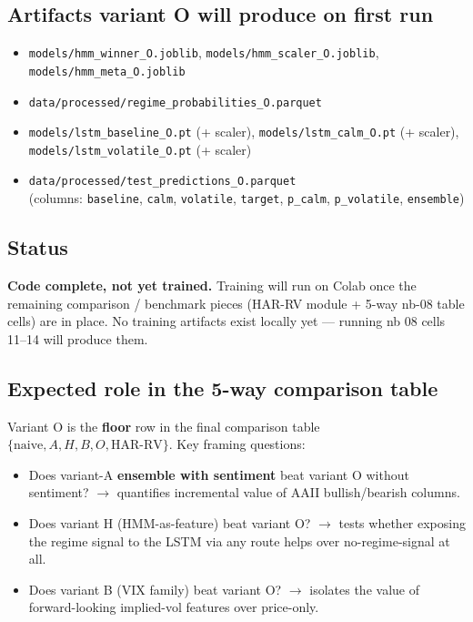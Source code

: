 \documentclass[11pt]{article}
\begin{document}
\subsection*{Artifacts variant O will produce on first run}

\begin{itemize}[leftmargin=*]
  \item \texttt{models/hmm\_winner\_O.joblib}, \allowbreak \texttt{models/hmm\_scaler\_O.joblib}, \allowbreak \texttt{models/hmm\_meta\_O.joblib}
  \item \texttt{data/processed/regime\_probabilities\_O.parquet}
  \item \texttt{models/lstm\_baseline\_O.pt} (+ scaler), \allowbreak \texttt{models/lstm\_calm\_O.pt} (+ scaler), \allowbreak \texttt{models/lstm\_volatile\_O.pt} (+ scaler)
  \item \texttt{data/processed/test\_predictions\_O.parquet} \\ (columns: \texttt{baseline}, \texttt{calm}, \texttt{volatile}, \texttt{target}, \texttt{p\_calm}, \texttt{p\_volatile}, \texttt{ensemble})
\end{itemize}

\subsection*{Status}

\textbf{Code complete, not yet trained.} Training will run on Colab once the remaining comparison / benchmark pieces (HAR-RV module + 5-way nb-08 table cells) are in place. No training artifacts exist locally yet --- running nb 08 cells 11--14 will produce them.

\subsection*{Expected role in the 5-way comparison table}

Variant O is the \textbf{floor} row in the final comparison table $\{\text{naive}, A, H, B, O, \text{HAR-RV}\}$. Key framing questions:

\begin{itemize}[leftmargin=*]
  \item Does variant-A \textbf{ensemble with sentiment} beat variant O without sentiment? $\to$ quantifies incremental value of AAII bullish/bearish columns.
  \item Does variant H (HMM-as-feature) beat variant O? $\to$ tests whether exposing the regime signal to the LSTM via any route helps over no-regime-signal at all.
  \item Does variant B (VIX family) beat variant O? $\to$ isolates the value of forward-looking implied-vol features over price-only.
\end{itemize}
\end{document}
